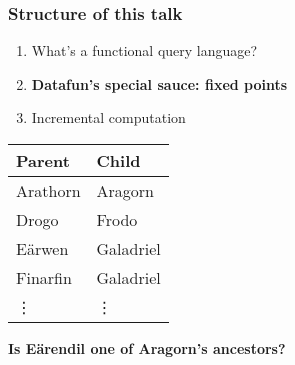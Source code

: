 \documentclass[xcolor=table]{beamer}
\begin{document}

\begin{frame}\Large
  \frametitle{Structure of this talk}
  \begin{enumerate}
    \itemsep 1.5em
  \item What's a functional query language?
  \item {\bf Datafun's special sauce: fixed points}
  \item Incremental computation
  \end{enumerate}
\end{frame}


\begin{frame}
  \large
  \centering

  \begin{minipage}{0.4\textwidth}
    \centering
    \begin{tabular}{l|l}
      \textbf{Parent} & \textbf{Child}\\\hline
      Arathorn & Aragorn\\
      Drogo & Frodo\\
      E\"arwen & Galadriel\\
      Finarfin & Galadriel\\
      \rowcolor{white}
      \hfill\vdots & \hfill\vdots
    \end{tabular}
  \end{minipage}

  \vspace{2em}\pause

  {\Large \bf Is E\"arendil one of Aragorn's ancestors?}

\end{frame}
\end{document}
